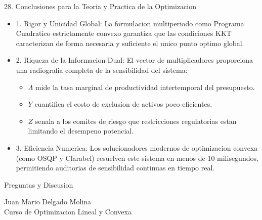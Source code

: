 \documentclass[aspectratio=169,10pt]{beamer}
\begin{document}
\begin{frame}{28. Conclusiones para la Teoria y Practica de la Optimizacion}
  \begin{itemize}
    \item 1. Rigor y Unicidad Global: La formulacion multiperiodo como Programa Cuadratico estrictamente convexo garantiza que las condiciones KKT caracterizan de forma necesaria y suficiente el unico punto optimo global.
    \vspace{0.3cm}
    \item 2. Riqueza de la Informacion Dual: El vector de multiplicadores proporciona una radiografia completa de la sensibilidad del sistema:
    \begin{itemize}
      \item $\Lambda$ mide la tasa marginal de productividad intertemporal del presupuesto.
      \item $Y$ cuantifica el costo de exclusion de activos poco eficientes.
      \item $Z$ senala a los comites de riesgo que restricciones regulatorias estan limitando el desempeno potencial.
    \end{itemize}
    \vspace{0.3cm}
    \item 3. Eficiencia Numerica: Los solucionadores modernos de optimizacion convexa (como OSQP y Clarabel) resuelven este sistema en menos de 10 milisegundos, permitiendo auditorias de sensibilidad continuas en tiempo real.
  \end{itemize}
\end{frame}

\begin{frame}
  \begin{center}
    \vspace{1.5cm}
    {\Large Preguntas y Discusion}
    
    \vspace{1.0cm}
    Juan Mario Delgado Molina\\
    Curso de Optimizacion Lineal y Convexa
  \end{center}
\end{frame}
\end{document}
